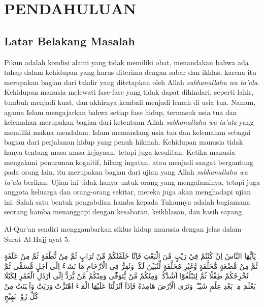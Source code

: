 \chapter{PENDAHULUAN}
    \section{Latar Belakang Masalah}

    Pikun adalah kondisi alami yang tidak memiliki obat, menandakan bahwa ada tahap dalam kehidupan yang harus diterima dengan sabar dan ikhlas, karena itu merupakan bagian dari takdir yang ditetapkan oleh Allah \textit{subhanallahu wa ta'ala}. Kehidupan manusia melewati fase-fase yang tidak dapat dihindari, seperti lahir, tumbuh menjadi kuat, dan akhirnya kembali menjadi lemah di usia tua. Namun, agama Islam mengajarkan bahwa setiap fase hidup, termasuk usia tua dan kelemahan merupakan bagian dari ketentuan Allah \textit{subhanallahu wa ta'ala} yang memiliki makna mendalam. Islam memandang usia tua dan kelemahan sebagai bagian dari perjalanan hidup yang penuh hikmah. Kehidupan manusia tidak hanya tentang masa-masa kejayaan, tetapi juga kesulitan. Ketika manusia mengalami penurunan kognitif, hilang ingatan, atau menjadi sangat bergantung pada orang lain, itu merupakan bagian dari ujian yang Allah \textit{subhanallahu wa ta'ala} berikan. Ujian ini tidak hanya untuk orang yang mengalaminya, tetapi juga anggota keluarga dan orang-orang sekitar, mereka juga akan menghadapi ujian ini. Salah satu bentuk pengabdian hamba kepada Tuhannya adalah bagiamana seorang hamba menanggapi dengan kesabaran, keikhlasan, dan kasih sayang.

    Al-Qur'an sendiri menggambarkan siklus hidup manusia dengan jelas dalam Surat Al-Hajj ayat 5.

    \begin{flushright}
        \begin{RLtext}
            يٰٓاَيُّهَا النَّاسُ اِنْ كُنْتُمْ فِيْ رَيْبٍ مِّنَ الْبَعْثِ فَاِنَّا خَلَقْنٰكُمْ مِّنْ تُرَابٍ ثُمَّ مِنْ نُّطْفَةٍ ثُمَّ مِنْ عَلَقَةٍ ثُمَّ مِنْ مُّضْغَةٍ مُّخَلَّقَةٍ وَّغَيْرِ مُخَلَّقَةٍ لِّنُبَيِّنَ لَكُمْۗ وَنُقِرُّ فِى الْاَرْحَامِ مَا نَشَاۤءُ اِلٰٓى اَجَلٍ مُّسَمًّى ثُمَّ نُخْرِجُكُمْ طِفْلًا ثُمَّ لِتَبْلُغُوْٓا اَشُدَّكُمْۚ وَمِنْكُمْ مَّنْ يُّتَوَفّٰى وَمِنْكُمْ مَّنْ يُّرَدُّ اِلٰٓى اَرْذَلِ الْعُمُرِ لِكَيْلَا يَعْلَمَ مِنْۢ بَعْدِ عِلْمٍ شَيْـًٔاۗ وَتَرَى الْاَرْضَ هَامِدَةً فَاِذَآ اَنْزَلْنَا عَلَيْهَا الْمَاۤءَ اهْتَزَّتْ وَرَبَتْ وَاَنْۢبَتَتْ مِنْ كُلِّ زَوْجٍۢ بَهِيْجٍ
        \end{RLtext}
    \end{flushright}
    
